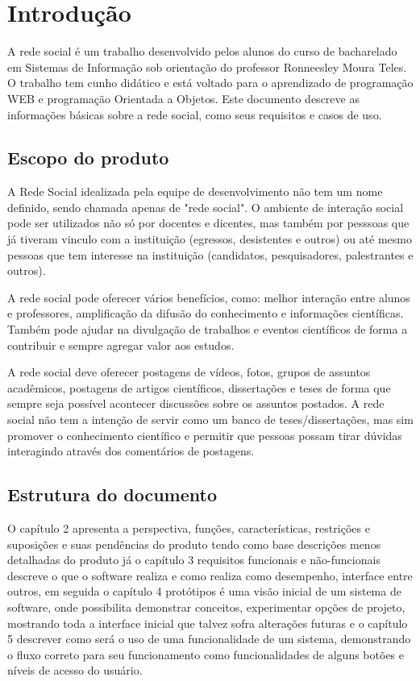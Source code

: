 \chapter{Introdução}

A rede social é um trabalho desenvolvido pelos alunos do curso de bacharelado em Sistemas de Informação sob orientação do professor Ronneesley Moura Teles.
O trabalho tem cunho didático e está voltado para o aprendizado de programação WEB e programação Orientada a Objetos.
Este documento descreve as informações básicas sobre a rede social, como seus requisitos e casos de uso.


\section{Escopo do produto}
A Rede Social idealizada pela equipe de desenvolvimento não tem um nome definido, sendo chamada apenas de "rede social".
O ambiente de interação social pode ser utilizados não só por docentes e dicentes, mas também por pesssoas que já tiveram vinculo com a instituição (egressos, desistentes e outros) ou até mesmo
pessoas que tem interesse na instituição (candidatos, pesquisadores, palestrantes e outros).

A rede social pode oferecer vários benefícios, como: melhor interação entre alunos e professores, amplificação da difusão do conhecimento e informações científicas.
Também pode ajudar na divulgação de trabalhos e eventos científicos de forma a contribuir e sempre agregar valor aos estudos.

A rede social deve oferecer postagens de vídeos, fotos, grupos de assuntos acadêmicos, postagens de artigos científicos, dissertações e teses de forma que sempre seja possível 
acontecer discussões sobre os assuntos postados. A rede social não tem a intenção de servir como um banco de teses/dissertações, mas sim promover o conhecimento científico e permitir
que pessoas possam tirar dúvidas interagindo através dos comentários de postagens. 
  

\section{Estrutura do documento}

O capítulo 2 apresenta a perspectiva, funções, características, restrições e suposições e suas pendências do produto tendo como base descrições menos detalhadas do produto já o capítulo 3 requisitos funcionais e não-funcionais descreve o que o software realiza e como realiza como desempenho, interface entre outros, em seguida o capítulo 4 protótipos é uma visão inicial de um sistema de software, onde possibilita demonstrar conceitos, experimentar opções de projeto, mostrando toda a interface inicial que talvez sofra alterações futuras e o capítulo 5 descrever como será o uso de uma funcionalidade de um sistema, demonstrando o fluxo correto para seu funcionamento como funcionalidades de alguns botões e níveis de acesso do usuário.